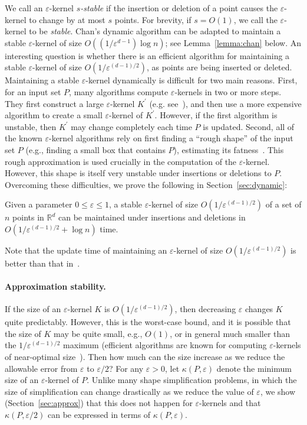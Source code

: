 \documentclass[11pt]{myclass}
\newcommand{\eps}{\varepsilon}
\renewcommand{\b}[1]{\ensuremath{\mathbb{#1}}}
\newcommand{\opt}[2]{\kappa(#1,#2)}
\begin{document}
We call an $\eps$-kernel
\emph{$s$-stable} if the insertion or deletion of a point 
causes the $\eps$-kernel to change by at most $s$ points.
For brevity, if $s=O(1)$, we call the $\eps$-kernel to be
\emph{stable}. Chan's dynamic algorithm can be adapted to maintain
a stable $\eps$-kernel of size $O((1/\eps^{d-1})\log n)$; see 
Lemma~\ref{lemma:chan} below.
An interesting question is whether there is an efficient algorithm 
for maintaining a stable $\eps$-kernel of size
$O(1/\eps^{(d-1)/2})$, as points are being inserted or
deleted.  Maintaining a stable $\eps$-kernel dynamically 
is difficult for two main reasons.  
First, for an input set $P$, many algorithms compute $\eps$-kernels in 
two or more steps. They first construct a large $\eps$-kernel 
$K^\prime$ (e.g. see~\cite{AHV04,Cha08}), and then use a more 
expensive algorithm to create a small 
$\eps$-kernel of $K^\prime$.  However, if the first algorithm is unstable, then $K^\prime$ may change completely each 
time $P$ is updated.  
Second, all of the known $\eps$-kernel algorithms rely on first finding 
a ``rough shape'' of the input set $P$ (e.g., finding a small
box that contains $P$), estimating its fatness~\cite{BH01}.  
This rough approximation is used crucially in the computation
of the $\eps$-kernel.  However, this shape is itself very unstable 
under insertions or deletions to $P$.  Overcoming these
difficulties, we prove the following in
Section~\ref{sec:dynamic}: 


\begin{theorem}
\label{theo:dynamic}
Given a parameter $0 \leq \eps \leq 1$, 
a stable $\eps$-kernel of size $O(1/\eps^{(d-1)/2})$ of a set of $n$ points in $\b{R}^d$ can be maintained under insertions and deletions in $O(1/\eps^{(d-1)/2} + \log n)$ time.
\end{theorem}

Note that the update time of maintaining an
$\eps$-kernel of size $O(1/\eps^{(d-1)/2})$ is better than
that in~\cite{Cha08}.
\paragraph{Approximation stability.}
If the size of an $\eps$-kernel $K$ is $O(1/\eps^{(d-1)/2})$,
 then decreasing $\eps$ changes $K$ quite predictably.
However, this is the worst-case bound, and
it is possible that the size of $K$ may be quite small, e.g.,
$O(1)$, or in general much smaller than the $1/\eps^{(d-1)/2}$ maximum
(efficient algorithms are known for computing
$\eps$-kernels of near-optimal size~\cite{AHV07}).  Then 
how much can the size increase as we reduce the allowable
error from $\eps$ to $\eps/2$?  
For any $\eps > 0$, let $\opt{P}{\eps}$ denote the minimum size of an  
$\eps$-kernel of $P$. 
Unlike many shape simplification problems, in which the size of
simplification can change drastically as we reduce the value
of $\eps$, we show (Section~\ref{sec:approx}) that 
this does not happen for $\eps$-kernels and that
$\opt{P}{\eps/2}$ can be expressed in terms of $\opt{P}{\eps}$. 
\end{document}
